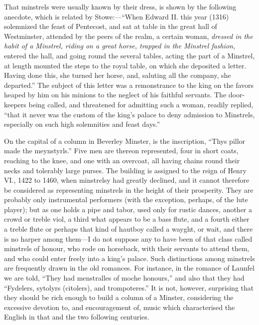 That minstrels were usually known by their dress, is shown by the following
anecdote, which is related by Stowe:—“When Edward II. this year (1316)
solemnized the feast of Pentecost, and sat at table in the great hall of Westminster,
attended by the peers of the realm, a certain woman, \textit{dressed in the habit
of a Minstrel, riding on a great horse, trapped in the Minstrel fashion}, entered the
hall, and going round the several tables, acting the part of a Minstrel, at length
mounted the steps to the royal table, on which she deposited a letter. Having
done this, she turned her horse, and, saluting all the company, she departed.”
The subject of this letter was a remonstrance to the king on the favors heaped
by him on his minions to the neglect of his faithful servants. The door-keepers
being called, and threatened for admitting such a woman, readily replied, “that
it never was the custom of the king’s palace to deny admission to Minstrels,
especially on such high solemnities and feast days.”

On the capital of a column in Beverley Minster, is the inscription, “Thys
pillor made the meynstyrls.” Five men are thereon represented, four in short
coats, reaching to the knee, and one with an overcoat, all having chains round
their necks and tolerably large purses. The building is assigned to the reign of
Henry VI., 1422 to 1460, when minstrelsy had greatly declined, and it cannot
therefore be considered as representing minstrels in the height of their prosperity.
They are probably only instrumental performers (with the exception, perhaps, of
the lute player); but as one holds a pipe and tabor, used only for rustic dances,
another a crowd or treble viol, a third what appears to be a bass flute, and a
fourth either a treble flute or perhaps that kind of hautboy called a wayght, or
wait, and there is no harper among them—I do not suppose any to have been of
that class called minstrels of honour, \pagebreak
who rode on horseback, with their servants 
 to attend them, and who could enter freely into a king’s palace. Such distinctions
among minstrels are frequently drawn in the old romances. For instance, in the
romance of Launfel we are told, “They had menstralles of moche honours,” and
also that they had “Fydelers, sytolyrs (citolers), and trompoteres.” It is not,
however, surprising that they should be rich enough to build a column of a
Minster, considering the excessive devotion to, and encouragement of, music which
characterised the English in that and the two following centuries.

